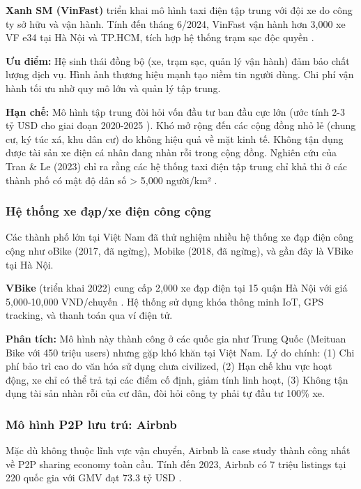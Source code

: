 \textbf{Xanh SM (VinFast)} triển khai mô hình taxi điện tập trung với đội xe do công ty sở hữu và vận hành. Tính đến tháng 6/2024, VinFast vận hành hơn 3,000 xe VF e34 tại Hà Nội và TP.HCM, tích hợp hệ thống trạm sạc độc quyền \cite{vinfast2024}.

\textbf{Ưu điểm:} Hệ sinh thái đồng bộ (xe, trạm sạc, quản lý vận hành) đảm bảo chất lượng dịch vụ. Hình ảnh thương hiệu mạnh tạo niềm tin người dùng. Chi phí vận hành tối ưu nhờ quy mô lớn và quản lý tập trung.

\textbf{Hạn chế:} Mô hình tập trung đòi hỏi vốn đầu tư ban đầu cực lớn (ước tính 2-3 tỷ USD cho giai đoạn 2020-2025 \cite{vinfast2024}). Khó mở rộng đến các cộng đồng nhỏ lẻ (chung cư, ký túc xá, khu dân cư) do không hiệu quả về mặt kinh tế. Không tận dụng được tài sản xe điện cá nhân đang nhàn rỗi trong cộng đồng. Nghiên cứu của Tran \& Le (2023) chỉ ra rằng các hệ thống taxi điện tập trung chỉ khả thi ở các thành phố có mật độ dân số > 5,000 người/km² \cite{tran2023}.

\subsubsection{Hệ thống xe đạp/xe điện công cộng}

Các thành phố lớn tại Việt Nam đã thử nghiệm nhiều hệ thống xe đạp điện công cộng như oBike (2017, đã ngừng), Mobike (2018, đã ngừng), và gần đây là VBike tại Hà Nội.

\textbf{VBike} (triển khai 2022) cung cấp 2,000 xe đạp điện tại 15 quận Hà Nội với giá 5,000-10,000 VND/chuyến \cite{vbike2024}. Hệ thống sử dụng khóa thông minh IoT, GPS tracking, và thanh toán qua ví điện tử.

\textbf{Phân tích:} Mô hình này thành công ở các quốc gia như Trung Quốc (Meituan Bike với 450 triệu users) nhưng gặp khó khăn tại Việt Nam. 
Lý do chính: (1) Chi phí bảo trì cao do văn hóa sử dụng chưa civilized, (2) Hạn chế khu vực hoạt động, xe chỉ có thể trả tại các điểm cố định, giảm tính linh hoạt, (3) Không tận dụng tài sản nhàn rỗi của cư dân, đòi hỏi công ty phải tự đầu tư 100\% xe.

\subsubsection{Mô hình P2P lưu trú: Airbnb}

Mặc dù không thuộc lĩnh vực vận chuyển, Airbnb là case study thành công nhất về P2P sharing economy toàn cầu. Tính đến 2023, Airbnb có 7 triệu listings tại 220 quốc gia với GMV đạt 73.3 tỷ USD \cite{airbnb2023}.

